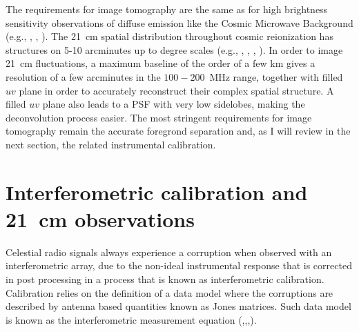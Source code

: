 The requirements for image tomography are the same as for high brightness sensitivity observations of diffuse emission like the Cosmic Microwave Background (e.g., \cite{halverson02}, \cite{dickinson04}, \cite{readhead04}). The 21~cm spatial distribution throughout cosmic reionization has structures on 5-10 arcminutes up to degree scales (e.g., \cite{majumdar12}, \cite{datta12}, \cite{mellema13}, \cite{kakiichi17}). In order to image 21~cm fluctuations, a maximum baseline of the order of a few km gives a resolution of a few arcminutes in the $100-200$~MHz range, together with filled $uv$ plane in order to accurately reconstruct their complex spatial structure. A filled $uv$ plane also leads to a PSF with very low sidelobes, making the deconvolution process easier. The most stringent requirements for image tomography remain the accurate foregrond separation and, as I will review in the next section, the related instrumental calibration.



\section{Interferometric calibration and 21~cm observations}
\label{sec:challenges}

Celestial radio signals always experience a corruption when observed with an interferometric array, due to the non-ideal instrumental response that is corrected in post processing in a process that is known as interferometric calibration. Calibration relies on the definition of a data model where the corruptions are described by antenna based quantities known as Jones matrices. Such data model is known as the interferometric measurement equation (\cite{hamaker96},\cite{smirnov11},\cite{smirnov11b},\cite{smirnov11c}).

